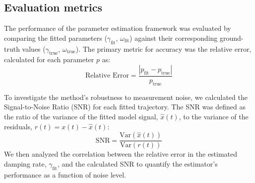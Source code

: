 \documentclass[]{article}
\begin{document}
\subsection{Evaluation metrics}
The performance of the parameter estimation framework was evaluated by comparing the fitted parameters ($\gamma_{\text{fit}}$, $\omega_{\text{fit}}$) against their corresponding ground-truth values ($\gamma_{\text{true}}$, $\omega_{\text{true}}$). The primary metric for accuracy was the relative error, calculated for each parameter $p$ as:
\begin{equation}
\text{Relative Error} = \frac{|p_{\text{fit}} - p_{\text{true}}|}{p_{\text{true}}}
\end{equation}

To investigate the method's robustness to measurement noise, we calculated the Signal-to-Noise Ratio (SNR) for each fitted trajectory. The SNR was defined as the ratio of the variance of the fitted model signal, $\hat{x}(t)$, to the variance of the residuals, $r(t) = x(t) - \hat{x}(t)$:
\begin{equation}
\text{SNR} = \frac{\text{Var}(\hat{x}(t))}{\text{Var}(r(t))}
\end{equation}
We then analyzed the correlation between the relative error in the estimated damping rate, $\gamma_{\text{fit}}$, and the calculated SNR to quantify the estimator's performance as a function of noise level.
\end{document}
